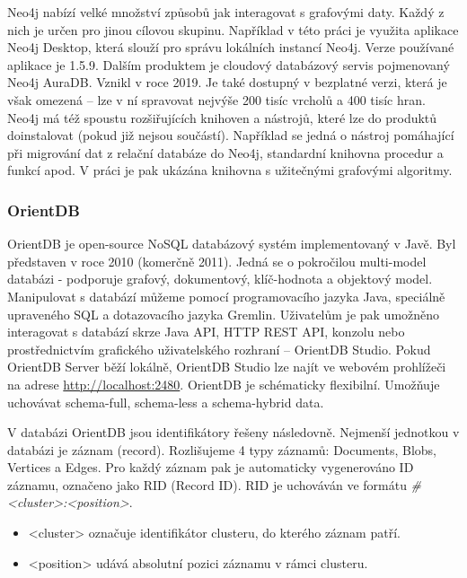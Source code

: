 \documentclass[
  program=infoi,
  biblatex=true,
  sourcecodes=true,
  figures=true,
  glossaries=false,
  index
]{kidiplom}
\begin{document}
Neo4j nabízí velké množství způsobů jak interagovat s grafovými daty. Každý z nich je určen pro jinou cílovou skupinu. Například v této práci je využita aplikace Neo4j Desktop, která slouží pro správu lokálních instancí Neo4j. Verze používané aplikace je 1.5.9.
Dalším produktem je cloudový databázový servis pojmenovaný Neo4j AuraDB. Vznikl v roce 2019. Je také dostupný v bezplatné verzi, která je však omezená -- lze v ní spravovat nejvýše 200 tisíc vrcholů a 400 tisíc hran.
Neo4j má též spoustu rozšiřujících knihoven a nástrojů, které lze do produktů doinstalovat (pokud již nejsou součástí). Například se jedná o nástroj pomáhající při migrování dat z relační databáze do Neo4j, standardní knihovna procedur a funkcí apod. V práci je pak ukázána knihovna s užitečnými grafovými algoritmy.

\subsubsection{OrientDB}
\cite{orientDBDoc}
OrientDB je open-source NoSQL databázový systém implementovaný v Javě. Byl představen v roce 2010 (komerčně 2011). Jedná se o pokročilou multi-model databázi - podporuje grafový, dokumentový, klíč-hodnota a objektový model. Manipulovat s databází můžeme pomocí programovacího jazyka Java, speciálně upraveného SQL a dotazovacího jazyka Gremlin. Uživatelům je pak umožněno interagovat s databází skrze Java API, HTTP REST API, konzolu nebo prostřednictvím grafického uživatelského rozhraní -- OrientDB Studio. Pokud OrientDB Server běží lokálně, OrientDB Studio lze najít ve webovém prohlížeči na adrese \url{http://localhost:2480}. OrientDB je schématicky flexibilní. Umožňuje uchovávat schema-full, schema-less a schema-hybrid data.

V databázi OrientDB jsou identifikátory řešeny následovně. Nejmenší jednotkou v databázi je záznam (record). Rozlišujeme 4 typy záznamů: Documents, Blobs, Vertices a Edges. Pro každý záznam pak je automaticky vygenerováno ID záznamu, označeno jako RID (Record ID). RID je uchováván ve formátu \textit{\#<cluster>:<position>}. 
\begin{itemize}
\item <cluster> označuje identifikátor clusteru, do kterého záznam patří. 
\item <position> udává absolutní pozici záznamu v rámci clusteru.
\end{itemize}
\end{document}
